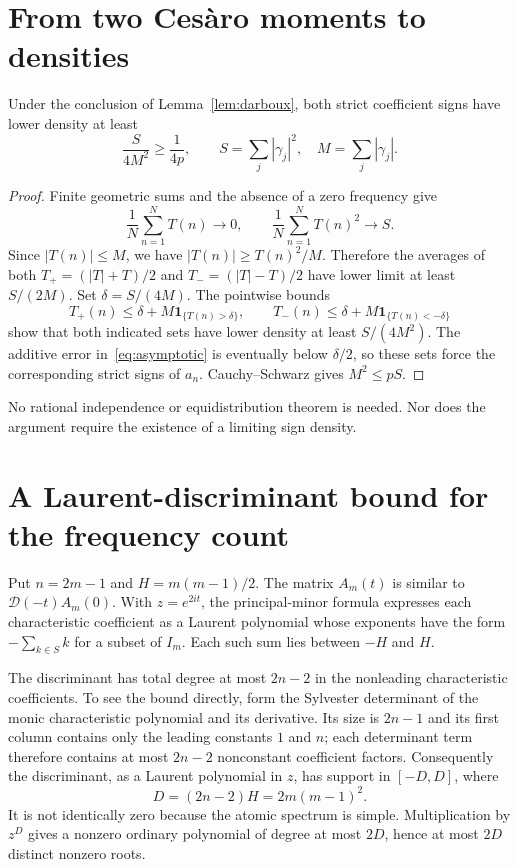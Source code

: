 \documentclass[11pt,a4paper]{article}
\theoremstyle{remark}\newtheorem*{ednote}{Editorial note (ProveIt, 2026-10-01)}
\begin{document}
\section{From two Ces\`aro moments to densities}
\begin{lemma}\label{lem:density}
Under the conclusion of Lemma~\ref{lem:darboux}, both strict coefficient signs have lower density at least
\[
 \frac{S}{4M^2}\ge\frac1{4p},\qquad
 S=\sum_j|\gamma_j|^2,\quad M=\sum_j|\gamma_j|.
\]
\end{lemma}
\begin{proof}
Finite geometric sums and the absence of a zero frequency give
\[
 \frac1N\sum_{n=1}^NT(n)\longrightarrow0,\qquad
 \frac1N\sum_{n=1}^NT(n)^2\longrightarrow S.
\]
Since $|T(n)|\le M$, we have $|T(n)|\ge T(n)^2/M$. Therefore the averages of both $T_+=(|T|+T)/2$ and $T_-=(|T|-T)/2$ have lower limit at least $S/(2M)$.
Set $\delta=S/(4M)$. The pointwise bounds
\[
 T_+(n)\le\delta+M\mathbf1_{\{T(n)>\delta\}},\qquad
 T_-(n)\le\delta+M\mathbf1_{\{T(n)<-\delta\}}
\]
show that both indicated sets have lower density at least $S/(4M^2)$. The additive error in~\eqref{eq:asymptotic} is eventually below $\delta/2$, so these sets force the corresponding strict signs of $a_n$. Cauchy--Schwarz gives $M^2\le pS$.
\end{proof}
No rational independence or equidistribution theorem is needed. Nor does the argument require the existence of a limiting sign density.

\section{A Laurent-discriminant bound for the frequency count}
Put $n=2m-1$ and $H=m(m-1)/2$. The matrix $A_m(t)$ is similar to $\mathcal D(-t)A_m(0)$. With $z=e^{2it}$, the principal-minor formula expresses each characteristic coefficient as a Laurent polynomial whose exponents have the form $-\sum_{k\in S}k$ for a subset of $I_m$. Each such sum lies between $-H$ and $H$.

The discriminant has total degree at most $2n-2$ in the nonleading characteristic coefficients. To see the bound directly, form the Sylvester determinant of the monic characteristic polynomial and its derivative. Its size is $2n-1$ and its first column contains only the leading constants $1$ and $n$; each determinant term therefore contains at most $2n-2$ nonconstant coefficient factors. Consequently the discriminant, as a Laurent polynomial in $z$, has support in $[-D,D]$, where
\[
 D=(2n-2)H=2m(m-1)^2.
\]
It is not identically zero because the atomic spectrum is simple. Multiplication by $z^D$ gives a nonzero ordinary polynomial of degree at most $2D$, hence at most $2D$ distinct nonzero roots.
\end{document}

